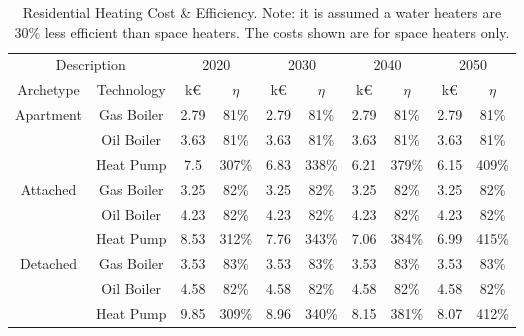 \documentclass[gmd,manuscript]{copernicus}
\begin{document}
\begin{table}[!htbp]
 \centering
 \footnotesize
 \caption{Residential Heating Cost \& Efficiency. Note: it is assumed a water heaters are 30\% less efficient than space heaters. The costs shown are for space heaters only.}
 \begin{tabular}{cccccccccc}
 \hline
 \multicolumn{2}{c}{Description} & \multicolumn{2}{c}{2020} & \multicolumn{2}{c}{2030} & \multicolumn{2}{c}{2040} & \multicolumn{2}{c}{2050} \\
 
 Archetype & Technology & k€ & $\eta$ & k€ & $\eta$ & k€ & $\eta$ & k€ & $\eta$ \\
 \hline
 \multirow{3}{*}{Apartment}&Gas Boiler & 2.79 & 81\% & 2.79 & 81\% & 2.79 & 81\% & 2.79 & 81\% \\
 & Oil Boiler & 3.63 & 81\% & 3.63 & 81\% & 3.63 & 81\% & 3.63 & 81\% \\
 & Heat Pump & 7.5 & 307\% & 6.83 & 338\% & 6.21 & 379\% & 6.15 & 409\% \\
 \hline
 \multirow{3}{*}{Attached}&Gas Boiler & 3.25 & 82\% & 3.25 & 82\% & 3.25 & 82\% & 3.25 & 82\% \\
 & Oil Boiler & 4.23 & 82\% & 4.23 & 82\% & 4.23 & 82\% & 4.23 & 82\% \\
 & Heat Pump & 8.53 & 312\% & 7.76 & 343\% & 7.06 & 384\% & 6.99 & 415\% \\
 \hline
 \multirow{3}{*}{Detached}&Gas Boiler & 3.53 & 83\% & 3.53 & 83\% & 3.53 & 83\% & 3.53 & 83\% \\
 & Oil Boiler & 4.58 & 82\% & 4.58 & 82\% & 4.58 & 82\% & 4.58 & 82\% \\
 & Heat Pump & 9.85 & 309\% & 8.96 & 340\% & 8.15 & 381\% & 8.07 & 412\% \\ \hline
 \end{tabular}
 
 \label{Residential Heating Cost & Efficiency}
\end{table}
\end{document}
